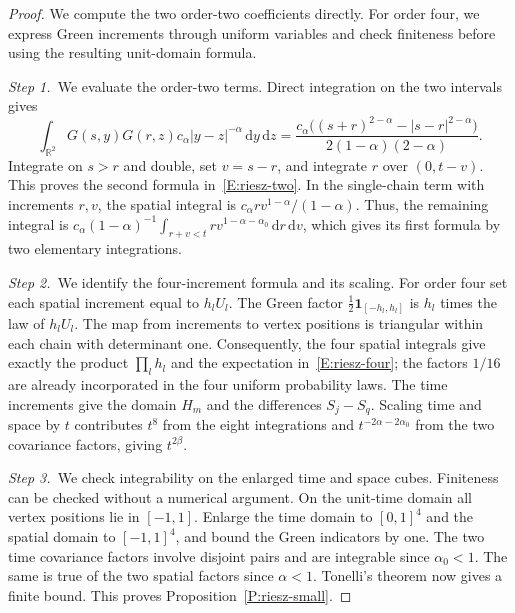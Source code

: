 \documentclass[12pt,oneside,openany]{book}
\numberwithin{equation}{section}
\theoremstyle{nogostyle}
\theoremstyle{definition}
\newcommand{\R}{\mathbb{R}}
\newcommand{\ud}{\,\mathrm{d}}
\begin{document}
\begin{proof}
  We compute the two order-two coefficients directly. For order four, we
  express Green increments through uniform variables and check finiteness
  before using the resulting unit-domain formula.


  \medskip
  \noindent\textit{Step 1.~}We evaluate the order-two terms.
  Direct integration on the two intervals gives
  \[
    \int_{\R^2}G(s,y)G(r,z)c_\alpha|y-z|^{-\alpha}\ud y\ud z
    =\frac{c_\alpha\big((s+r)^{2-\alpha}-|s-r|^{2-\alpha}\big)}
    {2(1-\alpha)(2-\alpha)}.
  \]
  Integrate on $s > r$ and double, set $v = s-r$, and integrate $r$ over
  $(0,t-v)$. This proves the second formula in~\eqref{E:riesz-two}. In the
  single-chain term with increments $r,v$, the spatial integral is $c_\alpha
  rv^{1-\alpha}/(1-\alpha)$. Thus, the remaining integral is
  $c_\alpha(1-\alpha)^{-1}\int_{r+v<t}rv^{1-\alpha-\alpha_0}\ud r\ud v$, which
  gives its first formula by two elementary integrations.


  \medskip
  \noindent\textit{Step 2.~}We identify the four-increment formula and its
  scaling.
  For order four set each spatial increment equal to $h_lU_l$. The Green factor
  $\frac12\mathbf1_{[-h_l,h_l]}$ is $h_l$ times the law of $h_lU_l$. The map
  from increments to vertex positions is triangular within each chain with
  determinant one. Consequently, the four spatial integrals give exactly the
  product $\prod_lh_l$ and the expectation in~\eqref{E:riesz-four}; the factors
  $1/16$ are already incorporated in the four uniform probability laws. The time
  increments give the domain $H_m$ and the differences $S_j-S_q$. Scaling time
  and space by $t$ contributes $t^8$ from the eight integrations and
  $t^{-2\alpha-2\alpha_0}$ from the two covariance factors, giving $t^{2\beta}$.


  \medskip
  \noindent\textit{Step 3.~}We check integrability on the enlarged time and
  space cubes.
  Finiteness can be checked without a numerical argument. On the unit-time
  domain all vertex positions lie in $[-1,1]$. Enlarge the time domain to
  $[0,1]^4$ and the spatial domain to $[-1,1]^4$, and bound the Green indicators
  by one. The two time covariance factors involve disjoint pairs and are
  integrable since $\alpha_0 < 1$. The same is true of the two spatial factors
  since $\alpha < 1$. Tonelli's theorem now gives a finite bound. This proves
  Proposition~\ref{P:riesz-small}.
\end{proof}
\end{document}
